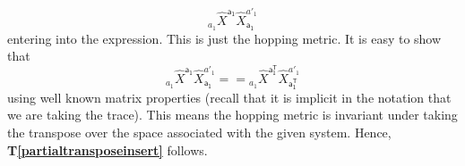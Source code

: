 \documentclass[10pt]{article}
\begin{document}
\begin{equation}
{}_{a_1}\! \hat X^\mathsf{a_1}\hat X_\mathsf{a_1}^{a'_1}
\end{equation}
entering into the expression.  This is just the hopping metric.  It is easy to show that
\begin{equation}
{}_{a_1}\! \hat X^\mathsf{a_1}\hat X_\mathsf{a_1}^{a'_1} =
   =  {}_{a_1}\! \hat X^\mathsf{a^T_1}\hat X_\mathsf{a^T_1}^{a'_1}
\end{equation}
using well known matrix properties (recall that it is implicit in the notation that we are taking the trace).  This means the hopping metric is invariant under taking the transpose over the space associated with the given system.  Hence, {\bf T\ref{partialtransposeinsert}} follows.

\end{document}
